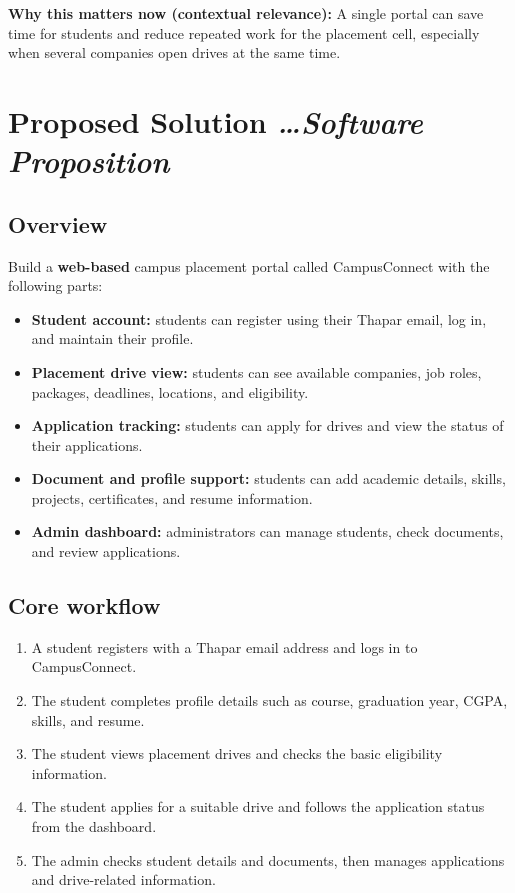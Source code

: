 \documentclass[11pt,a4paper]{article}
\newcommand{\BvrHint}[1]{{\normalfont\normalsize\itshape\hfill #1}}
\begin{document}
\textbf{Why this matters now (contextual relevance):} A single portal can save time for students and reduce repeated work for the placement cell, especially when several companies open drives at the same time.

\section{Proposed Solution \BvrHint{\ldots Software Proposition}}
\subsection{Overview}
Build a \textbf{web-based} campus placement portal called CampusConnect with the following parts:
\begin{itemize}[leftmargin=0.7cm]
  \item \textbf{Student account:} students can register using their Thapar email, log in, and maintain their profile.
  \item \textbf{Placement drive view:} students can see available companies, job roles, packages, deadlines, locations, and eligibility.
  \item \textbf{Application tracking:} students can apply for drives and view the status of their applications.
  \item \textbf{Document and profile support:} students can add academic details, skills, projects, certificates, and resume information.
  \item \textbf{Admin dashboard:} administrators can manage students, check documents, and review applications.
\end{itemize}

\subsection{Core workflow}
\begin{enumerate}[leftmargin=0.7cm]
  \item A student registers with a Thapar email address and logs in to CampusConnect.
  \item The student completes profile details such as course, graduation year, CGPA, skills, and resume.
  \item The student views placement drives and checks the basic eligibility information.
  \item The student applies for a suitable drive and follows the application status from the dashboard.
  \item The admin checks student details and documents, then manages applications and drive-related information.
\end{enumerate}
\end{document}
